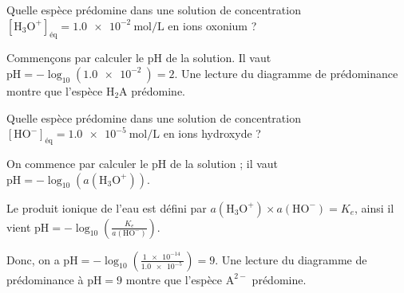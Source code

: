 
\begin{enonce}
Quelle espèce prédomine dans une solution de concentration $[\textrm{H}_3\textrm{O}^+]_\text{éq}=\SI{1,0e-2}{\mole\per\liter}$ en ions oxonium ?
\end{enonce}


\begin{corrige}
Commençons par calculer le \textrm{pH} de la solution. Il vaut $\textrm{pH}=-\log_{10}(\SI{1.0e-2}{})=2$. Une lecture du diagramme de prédominance montre que l'espèce $\textrm{H}_2\textrm{A}$ prédomine.
\end{corrige}


\begin{enonce}
Quelle espèce prédomine dans une solution de concentration $[\textrm{H}\textrm{O}^-]_\text{éq}=\SI{1,0e-5}{\mole\per\liter}$ en ions hydroxyde ?
\end{enonce}


\begin{corrige}
On commence par calculer le \textrm{pH} de la solution ; il vaut $\textrm{pH}=-\log_{10}(a(\textrm{H}_3\textrm{O}^+))$. 

Le produit ionique de l'eau est défini par $a(\textrm{H}_3\textrm{O}^+)\times a(\textrm{H}\textrm{O}^-)=K_e$, ainsi il vient $\textrm{pH}=-\log_{10}\left(\frac{K_e}{a(\textrm{H}\textrm{O}^-)}\right)$. 

Donc, on a  $\textrm{pH}=-\log_{10}\left(\frac{\SI{1e-14}{}}{\SI{1,0e-5}{}}\right)=9$.
Une lecture du diagramme de prédominance à $\textrm{pH}=9$ montre que l'espèce $\textrm{A}^{2-}$ prédomine.
\end{corrige}



\finEntrainement





